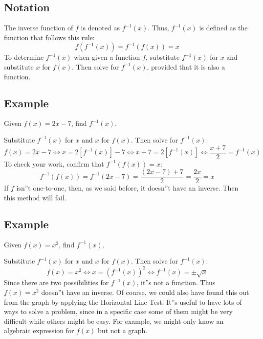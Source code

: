 \subsection{Notation}
\label{sss:nota-71f9}

The inverse function of $f$ is denoted as $f^{-1}(x)$. Thus, $f^{-1}(x)$ is defined as the function that follows this rule:
\[
f(f^{-1}(x)) = f^{-1}(f(x)) = x
\]
To determine $f^{-1}(x)$ when given a function $f$, substitute $f^{-1}(x)$ for $x$ and substitute $x$ for $f(x)$. Then solve for $f^{-1}(x)$, provided that it is also a function.

\subsection{Example}
\label{sss:exam-1a79}

Given $f(x) = 2x - 7$, find $f^{-1}(x)$.

Substitute $f^{-1}(x)$ for $x$ and $x$ for $f(x)$. Then solve for $f^{-1}(x)$:
\[
f(x) = 2x - 7 \Leftrightarrow x = 2[f^{-1}(x)] - 7 \Leftrightarrow x + 7 = 2[f^{-1}(x)] \Leftrightarrow \frac{x + 7}{2} = f^{-1}(x)
\]
To check your work, confirm that $f^{-1}(f(x)) = x$:
\[
f^{-1}(f(x)) = f^{-1}(2x - 7) = \frac{(2x - 7) + 7}{2} = \frac{2x}{2} = x
\]
If $f$ isn''t one-to-one, then, as we said before, it doesn''t have an inverse. Then this method will fail.

\subsection{Example}
\label{sss:exam-1a79}

Given $f(x) = x^2$, find $f^{-1}(x)$.

Substitute $f^{-1}(x)$ for $x$ and $x$ for $f(x)$. Then solve for $f^{-1}(x)$:
\[
f(x) = x^2 \Leftrightarrow x = (f^{-1}(x))^2 \Leftrightarrow f^{-1}(x) = \pm \sqrt{x}
\]
Since there are two possibilities for $f^{-1}(x)$, it''s not a function. Thus $f(x) = x^2$ doesn''t have an inverse. Of course, we could also have found this out from the graph by applying the Horizontal Line Test. It''s useful to have lots of ways to solve a problem, since in a specific case some of them might be very difficult while others might be easy. For example, we might only know an algebraic expression for $f(x)$ but not a graph.

